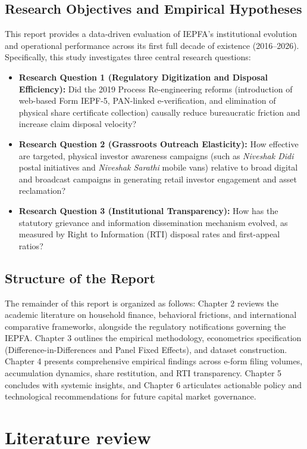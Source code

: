 \documentclass[openany]{book}
\begin{document}
\section{Research Objectives and Empirical Hypotheses}
This report provides a data-driven evaluation of IEPFA's institutional evolution and operational performance across its first full decade of existence (2016--2026). Specifically, this study investigates three central research questions:
\begin{itemize}
    \item \textbf{Research Question 1 (Regulatory Digitization and Disposal Efficiency):} Did the 2019 Process Re-engineering reforms (introduction of web-based Form IEPF-5, PAN-linked e-verification, and elimination of physical share certificate collection) causally reduce bureaucratic friction and increase claim disposal velocity?
    \item \textbf{Research Question 2 (Grassroots Outreach Elasticity):} How effective are targeted, physical investor awareness campaigns (such as \textit{Niveshak Didi} postal initiatives and \textit{Niveshak Sarathi} mobile vans) relative to broad digital and broadcast campaigns in generating retail investor engagement and asset reclamation?
    \item \textbf{Research Question 3 (Institutional Transparency):} How has the statutory grievance and information dissemination mechanism evolved, as measured by Right to Information (RTI) disposal rates and first-appeal ratios?
\end{itemize}

\section{Structure of the Report}
The remainder of this report is organized as follows: Chapter 2 reviews the academic literature on household finance, behavioral frictions, and international comparative frameworks, alongside the regulatory notifications governing the IEPFA. Chapter 3 outlines the empirical methodology, econometrics specification (Difference-in-Differences and Panel Fixed Effects), and dataset construction. Chapter 4 presents comprehensive empirical findings across e-form filing volumes, accumulation dynamics, share restitution, and RTI transparency. Chapter 5 concludes with systemic insights, and Chapter 6 articulates actionable policy and technological recommendations for future capital market governance.

\chapter{Literature review}
\end{document}

